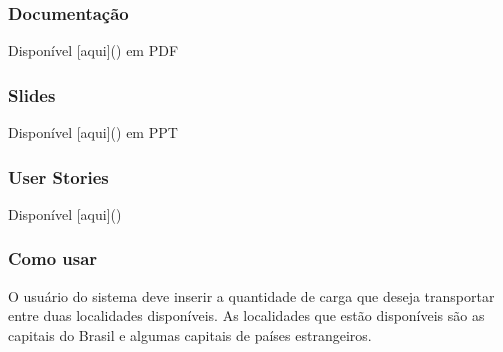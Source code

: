\subsubsection*{Documentação}

Disponível \mbox{[}aqui\mbox{]}() em P\+DF

\subsubsection*{Slides}

Disponível \mbox{[}aqui\mbox{]}() em P\+PT

\subsubsection*{User Stories}

Disponível \mbox{[}aqui\mbox{]}()

\subsubsection*{Como usar}

O usuário do sistema deve inserir a quantidade de carga que deseja transportar entre duas localidades disponíveis. As localidades que estão disponíveis são as capitais do Brasil e algumas capitais de países estrangeiros. 